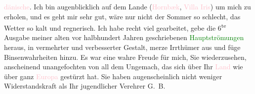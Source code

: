                         \textcolor{pink}{dänische}{}\ledrightnote{\textcolor{pink}{Dänemark}}.\pend
           \pstart
           Ich bin augenblicklich auf dem Lande (\textcolor{pink}{Hornbæk}{}\ledrightnote{\textcolor{pink}{Hornbæk}},
                        \textcolor{pink}{Villa Iris}{}\ledrightnote{\textcolor{pink}{Villa Iris}}) um mich zu erholen, und es
                    geht mir sehr gut, wäre nur nicht der Sommer so schlecht, das Wetter so kalt und
                    regnerisch. Ich habe recht viel gearbeitet, gebe die 6\textsuperscript{te} Ausgabe meiner alten vor halbhundert Jahren geschriebenen \textcolor{green}{Hauptströmungen}{}\ledrightnote{\textcolor{green}{Hauptströmungen der Literatur des neunzehnten Jahrhunderts}} heraus, in vermehrter und
                    verbesserter Gestalt, merze {\pb}Irrthümer aus und füge Binsenwahrheiten hinzu.\pend
           \pstart
           Es war eine wahre Freude für mich, Sie wiederzusehen, anscheinend unangefochten
                    von all dem Ungemach, das sich über Ihr \textcolor{pink}{Land}{} wie über ganz \textcolor{pink}{Europa}{}\ledrightnote{\textcolor{pink}{Europa}} gestürzt hat. Sie haben augenscheinlich nicht weniger
                    Widerstandskraft als Ihr jugendlicher Verehrer\pend
           \pstart \spacefill\mbox{G. B.}\pend{}\pstart
           \noindent{}\label{T_L02401_1v}\label{T_L02401_1h}\pend
           \endnumbering{}  
      